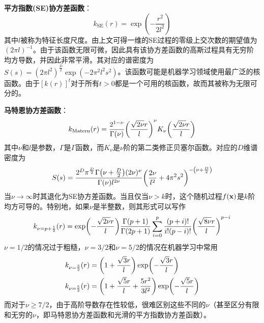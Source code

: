 \documentclass[12pt,UTF8]{article}
\begin{document}
                \textbf{平方指数(SE)协方差函数}：
                \begin{equation}
                    k_{\mathrm{SE}}(r)=\exp(-\frac{r^2}{2l^2})
                \end{equation}
                其中$l$被称为特征长度尺度。由上文可得一维的SE过程的零级上交次数的期望值为$(2\pi l)^{-1}$。由于该函数无限可微，因此具有该协方差函数的高斯过程具有无穷阶均方导数，并因此非常平滑。其对应的谱密度为$S(s)=(2\pi l^2)^{\frac{D}{2}}\exp(-2\pi^2l^2s^2)$。该函数可能是机器学习领域使用最广泛的核函数。由于$[k(r)]^t$对于所有$t>0$都是一个可用的核函数，故而其被称为无限可分的。\par
                \textbf{马特恩协方差函数}：
                \begin{equation}
                    k_{\mathrm{Matern}}(r)=\frac{2^{1-\nu}}{\Gamma(\nu)}\qty(\frac{\sqrt{2\nu}r}{l})^{\nu}K_\nu\qty(\frac{\sqrt{2\nu}r}{l})
                \end{equation}
                其中$\nu$和$l$是参数，$\Gamma$是$\Gamma$函数，而$K_\nu$是$\nu$阶的第二类修正贝塞尔函数。对应的$D$维谱密度为
                \begin{equation}
                    S(s)=\frac{2^D\pi^{\frac{D}{2}}\Gamma\qty(\nu+\frac{D}{2})(2\nu)^{\nu}}{\Gamma(\nu)l^{2\nu}}\qty(\frac{2\nu}{l^2}+4\pi^2s^2)^{-\qty(\nu+\frac{D}{2})}
                \end{equation}
                当$\nu\rightarrow\infty$时其退化为SE协方差函数。当且仅当$\nu>k$时，这个随机过程$f(\vb{x})$是$k$阶均方可导的。特别地，如果$\nu$是半整数，则其形式可以写作
                \begin{equation}
                    k_{\nu=p+\frac{1}{2}}(r)=\exp(-\frac{\sqrt{2\nu}r}{l})\frac{\Gamma(p+1)}{\Gamma(2p+1)}\sum_{i=0}^p{\frac{(p+i)!}{i!(p-i)!}\qty(\frac{\sqrt{8\nu}r}{l})^{p-i}}
                \end{equation}
                $\nu=1/2$的情况过于粗糙，$\nu=3/2$和$\nu=5/2$的情况在机器学习中常用
                \begin{align}
                    &k_{\nu=\frac{3}{2}}(r)=\qty(1+\frac{\sqrt{3}r}{l})\exp(-\frac{\sqrt{3}r}{l}) \\
                    &k_{\nu=\frac{5}{2}}(r)=\qty(1+\frac{\sqrt{5}r}{l}+\frac{5r^2}{3l^2})\exp(-\frac{\sqrt{5}r}{l})
                \end{align}
                而对于$\nu\geqslant 7/2$，由于高阶导数存在性较低，很难区别这些不同的$\nu$（甚至区分有限和无穷的$\nu$，即马特恩协方差函数和光滑的平方指数协方差函数）。\par
\end{document}
